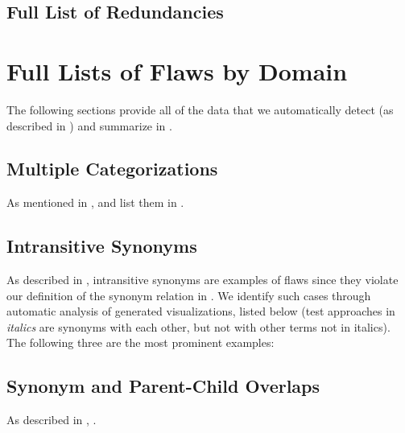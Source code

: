 \subsection{Full List of Redundancies}\label{redun-full}


\section{Full Lists of Flaws by Domain}\label{flawDmn-full}

The following sections provide all of the data that we automatically detect
(as described in ) and summarize in .

\subsection{Multiple Categorizations}\label{multiCats-full}

As mentioned in , \multiCatIntro{} and list them in
.

\begin{landscape}
    
\end{landscape}

\subsection{Intransitive Synonyms}\label{multiSyns}
As described in , intransitive synonyms are examples of
flaws since they violate our definition of the synonym relation in
. We identify \multiSynCount{}
such cases through automatic analysis of generated visualizations\ifnotpaper,
listed below (test approaches in \emph{italics} are synonyms with each other,
but not with other terms not in italics)\else. The following three are the most prominent examples\fi:

\begin{enumerate}
    
\end{enumerate}

\subsection{Synonym and Parent-Child Overlaps}\label{parSyns-full}
As described in , \parSynIntro*{}.
\begin{landscape}
    
\end{landscape}

